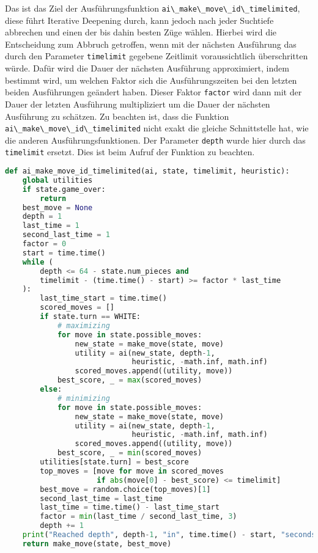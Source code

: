 Das ist das Ziel der Ausführungsfunktion
\passthrough{\lstinline!ai\_make\_move\_id\_timelimited!}, diese führt
Iterative Deepening durch, kann jedoch nach jeder Suchtiefe abbrechen
und einen der bis dahin besten Züge wählen. Hierbei wird die
Entscheidung zum Abbruch getroffen, wenn mit der nächsten Ausführung das
durch den Parameter \passthrough{\lstinline!timelimit!} gegebene
Zeitlimit voraussichtlich überschritten würde. Dafür wird die Dauer der
nächsten Ausführung approximiert, indem bestimmt wird, um welchen Faktor
sich die Ausführungszeiten bei den letzten beiden Ausführungen geändert
haben. Dieser Faktor \passthrough{\lstinline!factor!} wird dann mit der
Dauer der letzten Ausführung multipliziert um die Dauer der nächsten
Ausführung zu schätzen. Zu beachten ist, dass die Funktion
\passthrough{\lstinline!ai\_make\_move\_id\_timelimited!} nicht exakt
die gleiche Schnittstelle hat, wie die anderen Ausführungsfunktionen.
Der Parameter \passthrough{\lstinline!depth!} wurde hier durch das
\passthrough{\lstinline!timelimit!} ersetzt. Dies ist beim Aufruf der
Funktion zu beachten.

\begin{lstlisting}[language=Python]
def ai_make_move_id_timelimited(ai, state, timelimit, heuristic):
    global utilities
    if state.game_over:
        return
    best_move = None
    depth = 1
    last_time = 1
    second_last_time = 1
    factor = 0
    start = time.time()
    while (
        depth <= 64 - state.num_pieces and
        timelimit - (time.time() - start) >= factor * last_time
    ):
        last_time_start = time.time()
        scored_moves = []
        if state.turn == WHITE:
            # maximizing
            for move in state.possible_moves:
                new_state = make_move(state, move)
                utility = ai(new_state, depth-1,
                             heuristic, -math.inf, math.inf)
                scored_moves.append((utility, move))
            best_score, _ = max(scored_moves)
        else:
            # minimizing
            for move in state.possible_moves:
                new_state = make_move(state, move)
                utility = ai(new_state, depth-1,
                             heuristic, -math.inf, math.inf)
                scored_moves.append((utility, move))
            best_score, _ = min(scored_moves)
        utilities[state.turn] = best_score
        top_moves = [move for move in scored_moves
                     if abs(move[0] - best_score) <= timelimit]
        best_move = random.choice(top_moves)[1]
        second_last_time = last_time
        last_time = time.time() - last_time_start
        factor = min(last_time / second_last_time, 3)
        depth += 1
    print("Reached depth", depth-1, "in", time.time() - start, "seconds")
    return make_move(state, best_move)
\end{lstlisting}
